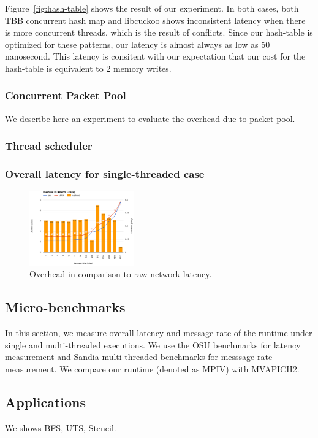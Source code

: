 Figure~\ref{fig:hash-table} shows the result of our experiment. In both cases,
both TBB concurrent hash map and libcuckoo shows inconsistent latency when
there is more concurrent threads, which is the result of conflicts. Since our
hash-table is optimized for these patterns, our latency is almost always as low
as 50 nanosecond. This latency is consitent with our expectation that our cost
for the hash-table is equivalent to 2 memory writes.

\subsubsection{Concurrent Packet Pool}
We describe here an experiment to evaluate the overhead due to packet pool.

\subsubsection{Thread scheduler}
\subsubsection{Overall latency for single-threaded case}
\begin{figure}
  \centering 
  \includegraphics[width=0.4\textwidth]{fig/overhead.png}
  \caption{Overhead in comparison to raw network latency.}
\end{figure}

\subsection{Micro-benchmarks}
In this section, we measure overall latency and message rate of the runtime
under single and multi-threaded executions. We use the OSU benchmarks for
latency measurement and Sandia multi-threaded benchmarks for messsage rate
measurement. We compare our runtime (denoted as MPIV) with MVAPICH2.


\subsection{Applications}
We shows BFS, UTS, Stencil.

